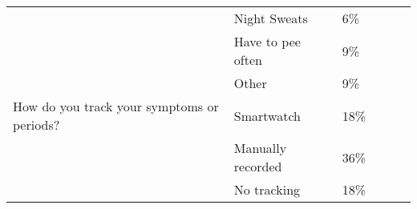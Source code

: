 \begin{table}[]
\begin{tabular}{llllll}
                                                                                    & Night Sweats           & 6\%  &  &  &  \\
                                                                                    & Have to pee often      & 9\%  &  &  &  \\
                                                                                    & Other                  & 9\%  &  &  &  \\
    How do you track your symptoms or periods?                                      & Smartwatch             & 18\% &  &  &  \\
                                                                                    & Manually recorded      & 36\% &  &  &  \\
                                                                                    & No tracking            & 18\% &  &  & 
    \end{tabular}
    \end{table}